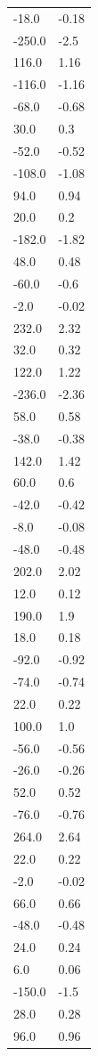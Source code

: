 \begin{longtable}{ll}
-18.0 & -0.18 \\
-250.0 & -2.5 \\
116.0 & 1.16 \\
-116.0 & -1.16 \\
-68.0 & -0.68 \\
30.0 & 0.3 \\
-52.0 & -0.52 \\
-108.0 & -1.08 \\
94.0 & 0.94 \\
20.0 & 0.2 \\
-182.0 & -1.82 \\
48.0 & 0.48 \\
-60.0 & -0.6 \\
-2.0 & -0.02 \\
232.0 & 2.32 \\
32.0 & 0.32 \\
122.0 & 1.22 \\
-236.0 & -2.36 \\
58.0 & 0.58 \\
-38.0 & -0.38 \\
142.0 & 1.42 \\
60.0 & 0.6 \\
-42.0 & -0.42 \\
-8.0 & -0.08 \\
-48.0 & -0.48 \\
202.0 & 2.02 \\
12.0 & 0.12 \\
190.0 & 1.9 \\
18.0 & 0.18 \\
-92.0 & -0.92 \\
-74.0 & -0.74 \\
22.0 & 0.22 \\
100.0 & 1.0 \\
-56.0 & -0.56 \\
-26.0 & -0.26 \\
52.0 & 0.52 \\
-76.0 & -0.76 \\
264.0 & 2.64 \\
22.0 & 0.22 \\
-2.0 & -0.02 \\
66.0 & 0.66 \\
-48.0 & -0.48 \\
24.0 & 0.24 \\
6.0 & 0.06 \\
-150.0 & -1.5 \\
28.0 & 0.28 \\
96.0 & 0.96 \\

\end{longtable}
